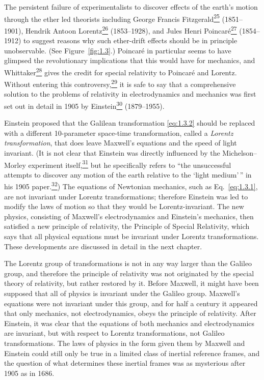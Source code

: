 The persistent failure of experimentalists to discover effects of the earth's
motion through the ether led theorists including George Francis
Fitzgerald\hyperref[ch1-ref-25]{\textsuperscript{25}} (1851--1901), Hendrik
Antoon Lorentz\hyperref[ch1-ref-26]{\textsuperscript{26}} (1853--1928), and
Jules Henri Poincar\'e\hyperref[ch1-ref-27]{\textsuperscript{27}}
(1854--1912) to suggest reasons why such ether-drift effects should be in
principle unobservable. (See Figure~\ref{fig:1.3}.) Poincar\'e in particular
seems to have glimpsed the revolutionary implications that this would have for
mechanics, and Whittaker\hyperref[ch1-ref-28]{\textsuperscript{28}} gives the
credit for special relativity to Poincar\'e and Lorentz. Without entering this
controversy,\hyperref[ch1-ref-29]{\textsuperscript{29}} it is safe to say that
a comprehensive solution to the problems of relativity in electrodynamics and
mechanics was first set out in detail in 1905 by
Einstein\hyperref[ch1-ref-30]{\textsuperscript{30}} (1879--1955).



Einstein proposed that the Galilean transformation \eqref{eq:1.3.2} should be
replaced with a different 10-parameter space-time transformation, called a
\emph{Lorentz transformation}, that does leave Maxwell's equations and the
speed of light invariant. (It is not clear that Einstein was directly
influenced by the Michelson--Morley experiment
itself,\hyperref[ch1-ref-31]{\textsuperscript{31}} but he specifically refers
to ``the unsuccessful attempts to discover any motion of the earth relative
to the `light medium'\,'' in his 1905
paper.\hyperref[ch1-ref-32]{\textsuperscript{32}}) The equations of Newtonian
mechanics, such as Eq.~\eqref{eq:1.3.1}, are not invariant under Lorentz
transformations; therefore Einstein was led to modify the laws of motion so
that they would be Lorentz-invariant. The new physics, consisting of
Maxwell's electrodynamics and Einstein's mechanics, then satisfied a new
principle of relativity, the Principle of Special Relativity, which says that
all physical equations must be invariant under Lorentz transformations. These
developments are discussed in detail in the next chapter.

The Lorentz group of transformations is not in any way larger than the
Galileo group, and therefore the principle of relativity was not originated by
the special theory of relativity, but rather restored by it. Before Maxwell,
it might have been supposed that all of physics is invariant under the Galileo
group. Maxwell's equations were not invariant under this group, and for half
a century it appeared that only mechanics, not electrodynamics, obeys the
principle of relativity. After Einstein, it was clear that the equations of
both mechanics and electrodynamics are invariant, but with respect to Lorentz
transformations, not Galileo transformations. The laws of physics in the form
given them by Maxwell and Einstein could still only be true in a limited class
of inertial reference frames, and the question of what determines these
inertial frames was as mysterious after 1905 as in 1686.

